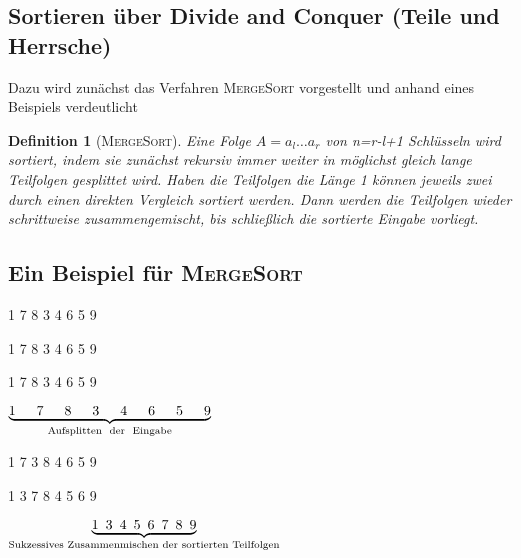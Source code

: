 \documentclass{scrreprt}%
\theoremstyle{break}
\newtheorem{definition}{Definition}
\begin{document}
\subsection{Sortieren über Divide and Conquer (Teile und Herrsche)}
%
%
Dazu wird zunächst das Verfahren \textsc{MergeSort} vorgestellt und anhand eines Beispiels verdeutlicht
\begin{definition}[\textsc{MergeSort}]
        Eine Folge $A=a_l\ldots a_r$ von n=r-l+1 Schlüsseln wird sortiert, indem sie zunächst rekursiv immer weiter
	in möglichst gleich lange Teilfolgen gesplittet wird. Haben die Teilfolgen die Länge 1 können jeweils zwei durch einen direkten
	Vergleich sortiert werden. Dann werden die Teilfolgen wieder schrittweise zusammengemischt, bis schließlich die sortierte Eingabe
	vorliegt. 
\end{definition}

\subsection{Ein Beispiel für \textsc{MergeSort}}

\begin{center}
1 7 8 3 4 6 5 9
\medskip

1 7 8 3 \hspace{10pt} 4 6 5 9
\medskip

1 7 \hspace{10pt} 8 3 \hspace{10pt} 4 6 \hspace{10pt} 5 9
\medskip

$\underbrace{1 \hspace{15pt} 7 \hspace{15pt} 8 \hspace{15pt} 3 \hspace{15pt} 4 \hspace{15pt} 6 \hspace{15pt} 5 \hspace{15pt}
9}_{\textrm{\textup{Aufsplitten \ der \ Eingabe}}}$
\medskip

1 7 \hspace{10pt} 3 8 \hspace{10pt} 4 6 \hspace{10pt} 5 9
\medskip

1 3 7 8 \hspace{10pt} 4 5 6 9
\medskip

$\underbrace{1 \hspace{5pt} 3 \hspace{5pt} 4 \hspace{5pt} 5 \hspace{5pt} 6 \hspace{5pt} 7 \hspace{5pt} 8 \hspace{5pt}
9}_{\textrm{\textup{Sukzessives Zusammenmischen der sortierten Teilfolgen}}}$
\end{center}
\end{document}
